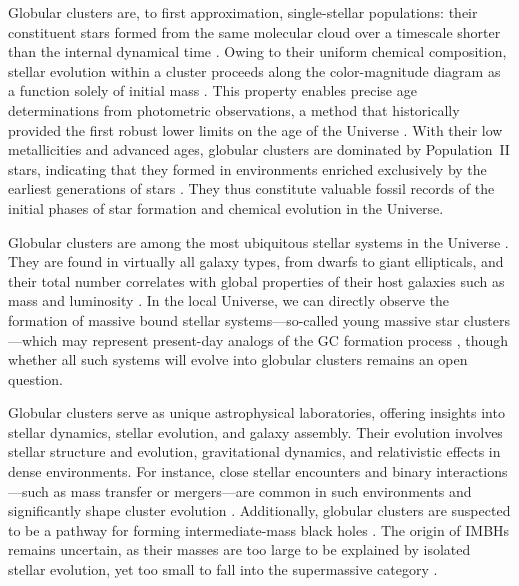     Globular clusters are, to first approximation, single-stellar populations: their constituent stars formed from the same molecular cloud over a timescale shorter than the internal dynamical time \citep{1988ApJ...324..288A,2009MNRAS.397..954F,2014PhR...539...49K}. Owing to their uniform chemical composition, stellar evolution within a cluster proceeds along the color-magnitude diagram as a function solely of initial mass \citep{2013sse..book.....K}. This property enables precise age determinations from photometric observations, a method that historically provided the first robust lower limits on the age of the Universe \citep{1959MNRAS.119..124H,1970ApJ...162..841S,1985A&A...147..169G,1992ApJ...400..265M}. With their low metallicities and advanced ages, globular clusters are dominated by Population~II stars, indicating that they formed in environments enriched exclusively by the earliest generations of stars \citep{2022A&A...668A.191C}. They thus constitute valuable fossil records of the initial phases of star formation and chemical evolution in the Universe.
    
    Globular clusters are among the most ubiquitous stellar systems in the Universe \citep{2006ARA&A..44..193B,2019ARA&A..57..227K}. They are found in virtually all galaxy types, from dwarfs to giant ellipticals, and their total number correlates with global properties of their host galaxies such as mass and luminosity \citep[e.g.,][]{2013ApJ...772...82H,2018MNRAS.481.5592F}. In the local Universe, we can directly observe the formation of massive bound stellar systems—so-called young massive star clusters—which may represent present-day analogs of the GC formation process \citep[e.g.,][]{2010ARA&A..48..431P,2020SSRv..216...69A}, though whether all such systems will evolve into globular clusters remains an open question.

    Globular clusters serve as unique astrophysical laboratories, offering insights into stellar dynamics, stellar evolution, and galaxy assembly. Their evolution involves stellar structure and evolution, gravitational dynamics, and relativistic effects in dense environments. For instance, close stellar encounters and binary interactions—such as mass transfer or mergers—are common in such environments and significantly shape cluster evolution \citep{2004MNRAS.349..129D,2016MNRAS.458.1450W,2024MNRAS.528.5119A}. Additionally, globular clusters are suspected to be a pathway for forming intermediate-mass black holes \citep{2013MNRAS.432.2779B,2015MNRAS.454.3150G}. The origin of IMBHs remains uncertain, as their masses are too large to be explained by isolated stellar evolution, yet too small to fall into the supermassive category \citep{2020ARA&A..58..257G}. 
    
